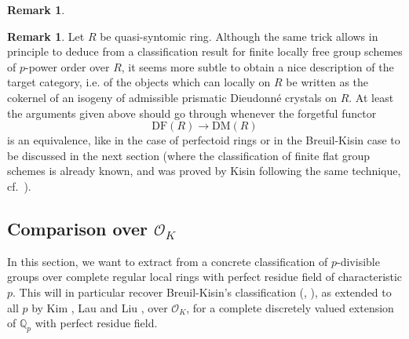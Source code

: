 \documentclass{amsart}
\newcommand{\prism}{{\mathlarger{\mathbbl{\Delta}}}}
\theoremstyle{plain}
\theoremstyle{definition}
\newtheorem{remark}[theorem]{Remark}
\newcommand{\Ext}{\mathcal{E}xt}
\newcommand{\DF}{\mathrm{DF}}
\newcommand{\purple}[1]{{\color{black} #1}}
\newcommand{\red}[1]{{\color{black} #1}}
\begin{document}
\begin{remark}
\end{remark}
\fi


\begin{remark}
  \label{remark-bk-case-finite-flat-group-schemes}
  \purple{Let $R$ be quasi-syntomic ring.} Although the same trick allows in principle to deduce from  a classification result for finite locally free group schemes of $p$-power order over $R$, it seems more subtle to obtain a nice description of the target category, i.e. of the objects which can locally on $R$ be written as the cokernel of an isogeny of \red{admissible} prismatic Dieudonn\'e crystals on $R$. At least the arguments given above should go through whenever the forgetful functor
  \[ \DF(R) \to \mathrm{DM}(R) \]
  is an equivalence, like in the case of perfectoid rings or in the Breuil-Kisin case to be discussed in the next section (where the classification of finite flat group schemes is already known, and was proved by Kisin following the same technique, cf.\ \cite[Section 2.3]{kisin_crystalline_representations_and_f_crystals}).
  \end{remark}



\subsection{Comparison over $\mathcal{O}_K$}
\label{sec:comp-case-mathc}

In this section, we want to extract from  a concrete classification of $p$-divisible groups over complete regular local rings with perfect residue field of characteristic $p$. This will in particular recover Breuil-Kisin's classification (\cite{breuil_schemas_en_groupes_et_corps_de_normes}, \cite{kisin_crystalline_representations_and_f_crystals}), as extended to all $p$ by Kim \cite{kim_the_classification_of_p_divisible_groups_over_2_adic_discrete_valuation_rings}, Lau \cite{lau_relations_between_dieudonne_displays_and_crystalline_dieudonne_theory} and Liu \cite{liu_the_correspondence_between_barsotti_tate_groups_and_kisin_modules_when_p_equal_2}, over $\mathcal{O}_K$, for a complete discretely valued extension of $\mathbb{Q}_p$ with perfect residue field.  
\end{document}
